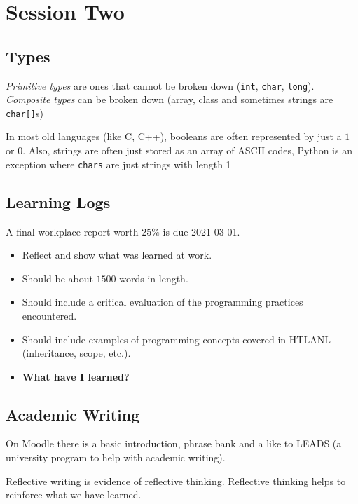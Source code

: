 \section{Session Two}\label{sub:session_2_types}

\subsection{Types}\label{ssub:types}

\emph{Primitive types} are ones that cannot be broken down (\texttt{int}, \texttt{char}, \texttt{long}).
\emph{Composite types} can be broken down (array, class and sometimes strings are \texttt{char[]}s)

\begin{note}
	In most old languages (like C, C++), booleans are often represented by just a \(1\) or  \(0\).
	Also, strings are often just stored as an array of ASCII codes, Python is an exception where \texttt{chars} are just strings with length 1
\end{note}

\subsection{Learning Logs}\label{ssub:learning_logs}

A final workplace report worth \(25\%\) is due 2021-03-01.
\begin{itemize}
	\item Reflect and show what was learned at work.
	\item Should be about \(1500\) words in length.
	\item Should include a critical evaluation of the programming practices encountered.
	\item Should include examples of programming concepts covered in HTLANL (inheritance, scope, etc.).
	\item \textbf{What have I learned?}
\end{itemize}

\subsection{Academic Writing}\label{ssub:academic_writing}

On Moodle there is a basic introduction, phrase bank and a like to LEADS (a university program to help with academic writing).

Reflective writing is evidence of reflective thinking.
Reflective thinking helps to reinforce what we have learned.

